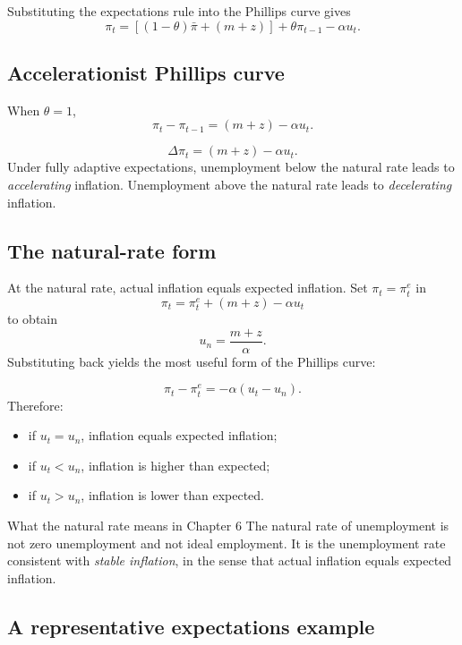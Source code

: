 \documentclass[12pt]{article}
\begin{document}
Substituting the expectations rule into the Phillips curve gives
\[
\pi_t=[(1-\theta)\bar{\pi}+(m+z)] + \theta\pi_{t-1}-\alpha u_t.
\]

\subsection{Accelerationist Phillips curve}

When $\theta=1$,
\[
\pi_t-\pi_{t-1}=(m+z)-\alpha u_t.
\]

\begin{keyformula}[title={Key Formula: Accelerationist Phillips curve}]
\[
\Delta\pi_t=(m+z)-\alpha u_t.
\]
Under fully adaptive expectations, unemployment below the natural rate leads to \emph{accelerating} inflation. Unemployment above the natural rate leads to \emph{decelerating} inflation.
\end{keyformula}

\subsection{The natural-rate form}

At the natural rate, actual inflation equals expected inflation. Set $\pi_t=\pi_t^e$ in
\[
\pi_t=\pi_t^e+(m+z)-\alpha u_t
\]
to obtain
\[
u_n=\frac{m+z}{\alpha}.
\]
Substituting back yields the most useful form of the Phillips curve:

\begin{keyformula}[title={Key Formula: Phillips curve around the natural rate}]
\[
\pi_t-\pi_t^e=-\alpha(u_t-u_n).
\]
Therefore:
\begin{itemize}[leftmargin=1.5em]
\item if $u_t=u_n$, inflation equals expected inflation;
\item if $u_t<u_n$, inflation is higher than expected;
\item if $u_t>u_n$, inflation is lower than expected.
\end{itemize}
\end{keyformula}

\begin{theorem}{What the natural rate means in Chapter 6}{}
The natural rate of unemployment is not zero unemployment and not ideal employment. It is the unemployment rate consistent with \emph{stable inflation}, in the sense that actual inflation equals expected inflation.
\end{theorem}

\subsection{A representative expectations example}
\end{document}
